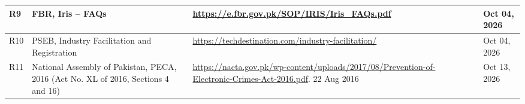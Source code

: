 \documentclass{FastFyp}
\begin{document}
\begin{longtable}{|L{0.07\textwidth}|L{0.30\textwidth}|L{0.34\textwidth}|L{0.19\textwidth}|}
R9 & FBR, Iris -- FAQs & \url{https://e.fbr.gov.pk/SOP/IRIS/Iris_FAQs.pdf} & Oct 04, 2026 \\ \hline

R10 & PSEB, Industry Facilitation and Registration & \url{https://techdestination.com/industry-facilitation/} & Oct 04, 2026 \\ \hline

R11 & National Assembly of Pakistan, PECA, 2016 (Act No. XL of 2016, Sections 4 and 16) & \url{https://nacta.gov.pk/wp-content/uploads/2017/08/Prevention-of-Electronic-Crimes-Act-2016.pdf}. 22 Aug 2016 & Oct 13, 2026 \\ \hline

\end{longtable}
\end{document}
